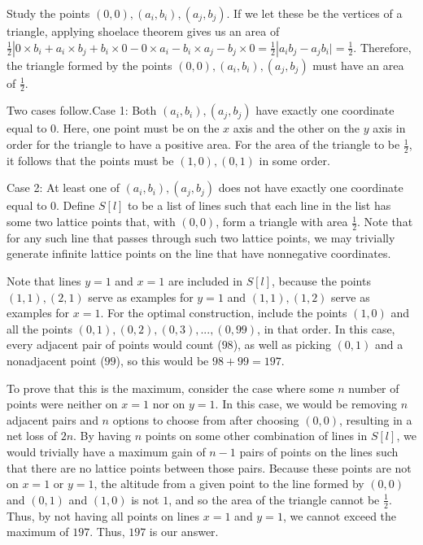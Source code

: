 \begin{enumerate}
 Study the points $(0, 0), (a_i, b_i), (a_j, b_j)$. If we let these be the vertices of a triangle, applying shoelace theorem gives us an area of $\frac{1}{2}|0\times{b_i}+{a_i}\times{b_j}+{b_i}\times{0}-0\times{a_i}-{b_i}\times{a_j}-{b_j}\times{0} = \frac{1}{2}|a_ib_j - a_j b_i| = \frac{1}{2}$. Therefore, the triangle formed by the points $(0, 0), (a_i, b_i), (a_j, b_j)$ must have an area of $\frac{1}{2}$. 

 Two cases follow.Case 1: Both $(a_i, b_i), (a_j, b_j)$ have exactly one coordinate equal to $0$. Here, one point must be on the $x$ axis and the other on the $y$ axis in order for the triangle to have a positive area. For the area of the triangle to be $\frac{1}{2}$, it follows that the points must be $(1, 0), (0, 1)$ in some order. 

 Case 2: At least one of $(a_i, b_i), (a_j, b_j)$ does not have exactly one coordinate equal to $0$. Define $S[l]$ to be a list of lines such that each line in the list has some two lattice points that, with $(0, 0)$, form a triangle with area $\frac{1}{2}$. Note that for any such line that passes through such two lattice points, we may trivially generate infinite lattice points on the line that have nonnegative coordinates. 

 Note that lines $y=1$ and $x=1$ are included in $S[l]$, because the points $(1, 1), (2, 1)$ serve as examples for $y=1$ and $(1, 1), (1, 2)$ serve as examples for $x=1$. For the optimal construction, include the points $(1, 0)$ and all the points $(0, 1), (0, 2), (0, 3), ... , (0, 99)$, in that order. In this case, every adjacent pair of points would count ($98$), as well as picking $(0, 1)$ and a nonadjacent point ($99$), so this would be $98+99=197$. 

 To prove that this is the maximum, consider the case where some $n$ number of points were neither on $x=1$ nor on $y=1$. In this case, we would be removing $n$ adjacent pairs and $n$ options to choose from after choosing $(0, 0)$, resulting in a net loss of $2n$. By having $n$ points on some other combination of lines in $S[l]$, we would trivially have a maximum gain of $n-1$ pairs of points on the lines such that there are no lattice points between those pairs. Because these points are not on $x=1$ or $y=1$, the altitude from a given point to the line formed by $(0, 0)$ and $(0, 1)$ and $(1, 0)$ is not $1$, and so the area of the triangle cannot be $\frac{1}{2}$. Thus, by not having all points on lines $x=1$ and $y=1$, we cannot exceed the maximum of $197$. Thus, $\boxed{197}$ is our answer. 


\end{enumerate}
